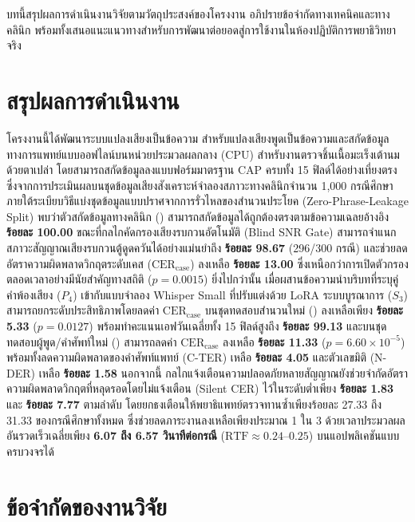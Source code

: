 บทนี้สรุปผลการดำเนินงานวิจัยตามวัตถุประสงค์ของโครงงาน อภิปรายข้อจำกัดทางเทคนิคและทางคลินิก พร้อมทั้งเสนอแนะแนวทางสำหรับการพัฒนาต่อยอดสู่การใช้งานในห้องปฏิบัติการพยาธิวิทยาจริง

\section{สรุปผลการดำเนินงาน}

โครงงานนี้ได้พัฒนาระบบแปลงเสียงเป็นข้อความ สำหรับแปลงเสียงพูดเป็นข้อความและสกัดข้อมูลทางการแพทย์แบบออฟไลน์บนหน่วยประมวลผลกลาง (CPU) สำหรับงานตรวจชิ้นเนื้อมะเร็งเต้านมด้วยตาเปล่า โดยสามารถสกัดข้อมูลลงแบบฟอร์มมาตรฐาน CAP ครบทั้ง 15 ฟิลด์ได้อย่างเที่ยงตรง ซึ่งจากการประเมินผลบนชุดข้อมูลเสียงสังเคราะห์จำลองสภาวะทางคลินิกจำนวน 1,000 กรณีศึกษา ภายใต้ระเบียบวิธีแบ่งชุดข้อมูลแบบปราศจากการรั่วไหลของสำนวนประโยค (Zero-Phrase-Leakage Split) พบว่าตัวสกัดข้อมูลทางคลินิก () สามารถสกัดข้อมูลได้ถูกต้องตรงตามข้อความเฉลยอ้างอิง \textbf{ร้อยละ 100.00} ขณะที่กลไกคัดกรองเสียงรบกวนอัตโนมัติ (Blind SNR Gate) สามารถจำแนกสภาวะสัญญาณเสียงรบกวนตู้ดูดควันได้อย่างแม่นยำถึง \textbf{ร้อยละ 98.67} (296/300 กรณี) และช่วยลดอัตราความผิดพลาดวิกฤตระดับเคส ($\text{CER}_{\text{case}}$) ลงเหลือ \textbf{ร้อยละ 13.00} ซึ่งเหนือกว่าการเปิดตัวกรองตลอดเวลาอย่างมีนัยสำคัญทางสถิติ ($p = 0.0015$) ยิ่งไปกว่านั้น เมื่อผสานข้อความนำบริบทที่ระบุคู่คำพ้องเสียง ($P_4$) เข้ากับแบบจำลอง Whisper Small ที่ปรับแต่งด้วย LoRA ระบบบูรณาการ ($S_3$) สามารถยกระดับประสิทธิภาพโดยลดค่า $\text{CER}_{\text{case}}$ บนชุดทดสอบสำนวนใหม่ () ลงเหลือเพียง \textbf{ร้อยละ 5.33} ($p = 0.0127$) พร้อมทำคะแนนเอฟวันเฉลี่ยทั้ง 15 ฟิลด์สูงถึง \textbf{ร้อยละ 99.13} และบนชุดทดสอบผู้พูด/คำศัพท์ใหม่ () สามารถลดค่า $\text{CER}_{\text{case}}$ ลงเหลือ \textbf{ร้อยละ 11.33} ($p = 6.60 \times 10^{-5}$) พร้อมทั้งลดความผิดพลาดของคำศัพท์แพทย์ (C-TER) เหลือ \textbf{ร้อยละ 4.05} และตัวเลขมิติ (N-DER) เหลือ \textbf{ร้อยละ 1.58} นอกจากนี้ กลไกแจ้งเตือนความปลอดภัยหลายสัญญาณยังช่วยจำกัดอัตราความผิดพลาดวิกฤตที่หลุดรอดโดยไม่แจ้งเตือน (Silent CER) ไว้ในระดับต่ำเพียง \textbf{ร้อยละ 1.83} และ \textbf{ร้อยละ 7.77} ตามลำดับ โดยยกธงเตือนให้พยาธิแพทย์ตรวจทานซ้ำเพียงร้อยละ 27.33 ถึง 31.33 ของกรณีศึกษาทั้งหมด ซึ่งช่วยลดภาระงานลงเหลือเพียงประมาณ 1 ใน 3 ด้วยเวลาประมวลผลอันรวดเร็วเฉลี่ยเพียง \textbf{6.07 ถึง 6.57 วินาทีต่อกรณี} ($\text{RTF} \approx 0.24\text{--}0.25$) บนแอปพลิเคชันแบบครบวงจรได้

\section{ข้อจำกัดของงานวิจัย}
\label{sec:limits}

